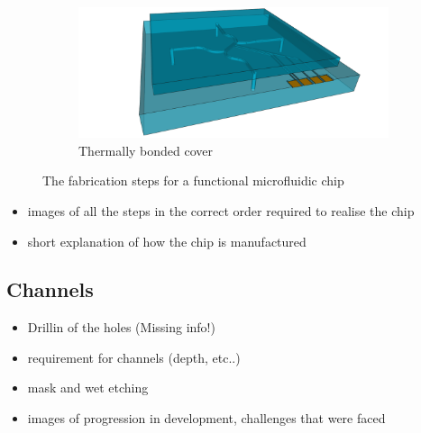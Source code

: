 \documentclass[final]{jyflluk}
\begin{document}
\begin{figure}
    \vspace{1cm}
    \begin{subfigure}[t]{\textwidth}
    \centering
        \includegraphics[width=\linewidth]{steps/11.Finished.png} 
        \caption{Thermally bonded cover} \label{fig:process11}
    \end{subfigure}
    \caption{The fabrication steps for a functional microfluidic chip} \label{fig:processFULL}
\end{figure}






\begin{itemize}
    \item images of all the steps in the correct order required to realise the chip
    \item short explanation of how the chip is manufactured
\end{itemize}







































\subsection{Channels}
\label{sec:xxx3}
\begin{itemize}
    \item Drillin of the holes (Missing info!)
    \item requirement for channels (depth, etc..)
    \item mask and wet etching
    \item images of progression in development, challenges that were faced
\end{itemize}
\end{document}
